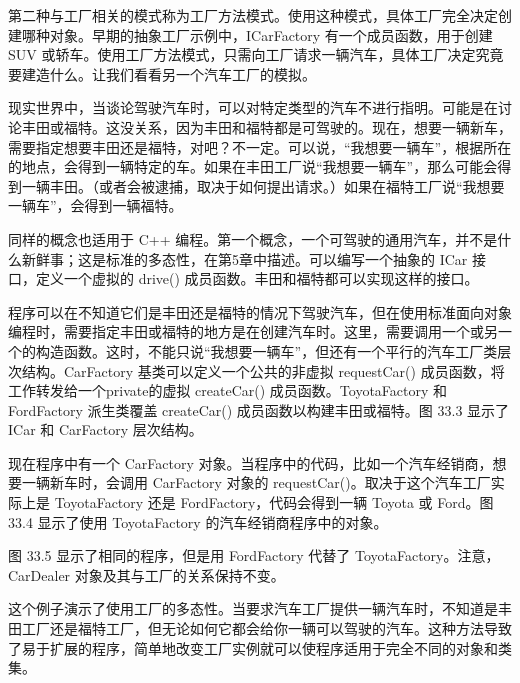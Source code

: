 
第二种与工厂相关的模式称为工厂方法模式。使用这种模式，具体工厂完全决定创建哪种对象。早期的抽象工厂示例中，ICarFactory 有一个成员函数，用于创建 SUV 或轿车。使用工厂方法模式，只需向工厂请求一辆汽车，具体工厂决定究竟要建造什么。让我们看看另一个汽车工厂的模拟。


现实世界中，当谈论驾驶汽车时，可以对特定类型的汽车不进行指明。可能是在讨论丰田或福特。这没关系，因为丰田和福特都是可驾驶的。现在，想要一辆新车，需要指定想要丰田还是福特，对吧？不一定。可以说，“我想要一辆车”，根据所在的地点，会得到一辆特定的车。如果在丰田工厂说“我想要一辆车”，那么可能会得到一辆丰田。（或者会被逮捕，取决于如何提出请求。）如果在福特工厂说“我想要一辆车”，会得到一辆福特。

同样的概念也适用于 C++ 编程。第一个概念，一个可驾驶的通用汽车，并不是什么新鲜事；这是标准的多态性，在第5章中描述。可以编写一个抽象的 ICar 接口，定义一个虚拟的 drive() 成员函数。丰田和福特都可以实现这样的接口。

程序可以在不知道它们是丰田还是福特的情况下驾驶汽车，但在使用标准面向对象编程时，需要指定丰田或福特的地方是在创建汽车时。这里，需要调用一个或另一个的构造函数。这时，不能只说“我想要一辆车”，但还有一个平行的汽车工厂类层次结构。CarFactory 基类可以定义一个公共的非虚拟 requestCar() 成员函数，将工作转发给一个private的虚拟 createCar() 成员函数。ToyotaFactory 和 FordFactory 派生类覆盖 createCar() 成员函数以构建丰田或福特。图 33.3 显示了 ICar 和 CarFactory 层次结构。


现在程序中有一个 CarFactory 对象。当程序中的代码，比如一个汽车经销商，想要一辆新车时，会调用 CarFactory 对象的 requestCar()。取决于这个汽车工厂实际上是 ToyotaFactory 还是 FordFactory，代码会得到一辆 Toyota 或 Ford。图 33.4 显示了使用 ToyotaFactory 的汽车经销商程序中的对象。


图 33.5 显示了相同的程序，但是用 FordFactory 代替了 ToyotaFactory。注意，CarDealer 对象及其与工厂的关系保持不变。


这个例子演示了使用工厂的多态性。当要求汽车工厂提供一辆汽车时，不知道是丰田工厂还是福特工厂，但无论如何它都会给你一辆可以驾驶的汽车。这种方法导致了易于扩展的程序，简单地改变工厂实例就可以使程序适用于完全不同的对象和类集。

